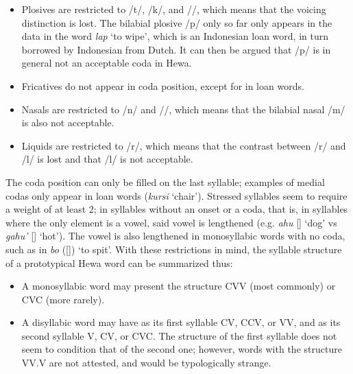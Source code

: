 \documentclass{article}
\begin{document}
\begin{itemize}

\item Plosives are restricted to /t/, /k/, and /\textglotstop /, which means that the voicing distinction is lost. The bilabial plosive /p/ only so far only appears in the data in the word \textit{lap} `to wipe', which is an Indonesian loan word, in turn borrowed by Indonesian from Dutch. It can then be argued that /p/ is in general not an acceptable coda in Hewa.

\item Fricatives do not appear in coda position, except for in loan words.

\item Nasals are restricted to /n/ and //, which means that the bilabial nasal /m/ is also not acceptable.

\item Liquids are restricted to /r/, which means that the contrast between /r/ and /l/ is lost and that /l/ is not acceptable.

\end{itemize}

The coda position can only be filled on the last syllable; examples of medial codas only appear in loan words (\textit{kursi} `chair'). Stressed syllables seem to require a weight of at least 2; in syllables without an onset or a coda, that is, in syllables where the only element is a vowel, said vowel is lengthened (e.g. \textit{ahu} [] `dog' vs \textit{gahu'} [] `hot'). The vowel is also lengthened in monosyllabic words with no coda, such as in  \textit{bo} ([]) `to spit'. With these restrictions in mind, the syllable structure of a prototypical Hewa word can be summarized thus:

\begin{itemize}

\item A monosyllabic word may present the structure CVV (most commonly) or CVC (more rarely).

\item A disyllabic word may have as its first syllable CV, CCV, or VV, and as its second syllable V, CV, or CVC. The structure of the first syllable does not seem to condition that of the second one; however, words with the structure VV.V are not attested, and would be typologically strange.

\end{itemize}
\end{document}
